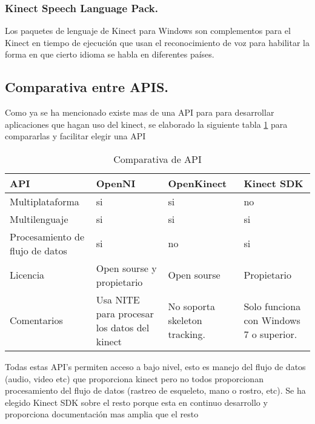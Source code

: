 \documentclass[11pt,a4paper]{article}
\begin{document}
\subsubsection{Kinect Speech Language Pack.}
Los paquetes de lenguaje de Kinect para Windows son complementos para el Kinect en tiempo de ejecución que usan el reconocimiento de voz para habilitar la forma en que cierto idioma se habla en diferentes países.

\subsection{Comparativa entre APIS.}
Como ya se ha mencionado existe mas de una API para para desarrollar aplicaciones que hagan uso del kinect, se elaborado la siguiente tabla \ref{comparativa_apis} para compararlas y facilitar elegir una API
\begin{table}[h]
	\begin{tabular}{||p{2.6cm}||p{2.5cm}||p{2.5cm}||p{2.5cm}||}
		\hline API & OpenNI & OpenKinect & Kinect SDK \\ 
		\hline Multiplataforma & si & si & no \\ 
		\hline Multilenguaje & si & si & si \\ 
		\hline Procesamiento de flujo de datos & si & no & si \\ 
		\hline Licencia & Open sourse y propietario & Open sourse & Propietario \\ 
		\hline Comentarios & Usa NITE para procesar los datos del kinect & No soporta skeleton tracking. & Solo funciona con Windows 7 o superior. \\ 
		\hline 
	\end{tabular} 
	\caption{Comparativa de API}
	\label{comparativa_apis}
\end{table}

Todas estas API's permiten acceso a bajo nivel, esto es manejo del flujo de datos (audio, video etc) que proporciona kinect pero no todos proporcionan procesamiento del flujo de datos (rastreo de esqueleto, mano o rostro, etc). Se ha elegido Kinect SDK sobre el resto porque esta en continuo desarrollo y proporciona documentación mas amplia que el resto 


\newpage
\printglossaries
%
\newpage
%
\end{document}
